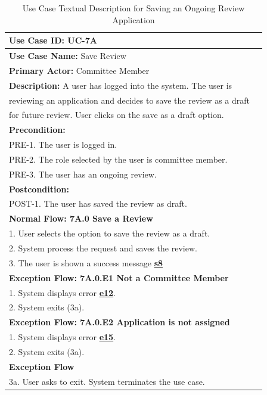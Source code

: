 \documentclass[fontsize=12pt,paper=letter,twoside]{scrartcl}
\begin{document}
\begin{table}[!htb]
\begin{center}
\begin{tabular}{|l|l|}
\hline
\textbf{Use Case ID:} UC-7A \\ \hline
\textbf{Use Case Name:} Save Review \\ \hline
\textbf {Primary Actor:} Committee Member \\ \hline
\textbf{Description:} A user has logged into the system. The user is \\reviewing an application and decides to save the review as a draft \\for future review. User clicks on the save as a draft option.\\ \hline
\textbf{Precondition:}
\\ PRE-1. The user is logged in.
\\ PRE-2. The role selected by the user is committee member.
\\ PRE-3. The user has an ongoing review.\\ \hline
\textbf{Postcondition:}
\\ POST-1. The user has saved the review as draft. \\ \hline
\textbf{Normal Flow: 7A.0 Save a Review}
\\ 1. User selects the option to save the review as a draft.
\\ 2. System process the request and saves the review.
\\ 3. The user is shown a success message \hyperref[app:success]{\textbf{s8}}\ \\ \hline
\textbf{Exception Flow: 7A.0.E1 Not a Committee Member}
\\ 1. System displays error  \hyperref[app:error]{\textbf{e12}}.
\\ 2. System exits (3a). \\ \hline 
\textbf{Exception Flow: 7A.0.E2 Application is not assigned}
\\ 1. System displays error \hyperref[app:error]{\textbf{e15}}.
\\ 2. System exits (3a). \\ \hline
\textbf{Exception Flow}
\\ 3a. User asks to exit. System terminates the use case.\\ \hline
\end{tabular}
\end{center}
\caption {Use Case Textual Description for Saving an Ongoing Review Application}
\label{tbl:uc7Atd}
\end{table}
\end{document}
